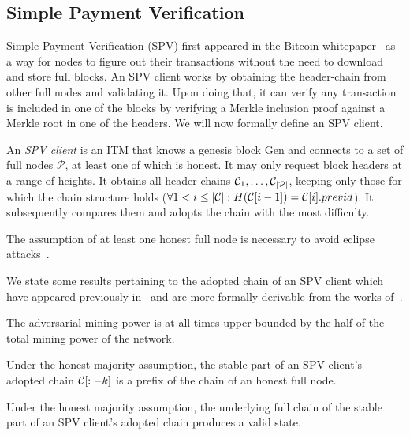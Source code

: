 \subsection{Simple Payment Verification}
Simple Payment Verification (SPV) first appeared in the Bitcoin whitepaper~\cite{bitcoin} as a way for nodes to figure out their transactions without the need to download and store full blocks. An SPV client works by obtaining the header-chain from other full nodes and validating it. Upon doing that, it can verify any transaction is included in one of the blocks by verifying a Merkle inclusion proof against a Merkle root in one of the headers. We will now formally define an SPV client.

\begin{definition}
An \emph{SPV client} is an ITM that knows a genesis block \textsf{Gen} and connects to a set of full nodes $\mathcal{P}$, at least one of which is honest. It may only request block headers at a range of heights. It obtains all header-chains $\mathcal{C}_1, \dots, \mathcal{C}_{|\mathcal{P}|}$, keeping only those for which the chain structure holds ($\forall 1 < i \le |\mathcal{C}|: H(\mathcal{C}[i-1]) = \mathcal{C}[i].previd$). It subsequently compares them and adopts the chain with the most difficulty.
\end{definition}

The assumption of at least one honest full node is necessary to avoid eclipse attacks~\cite{eclipse,eclipse-ethereum}.

We state some results pertaining to the adopted chain of an SPV client which have appeared previously in~\cite{sok,sidechains} and are more formally derivable from the works of~\cite{backbone,garay2017bitcoin,pass2017analysis}.

\begin{definition}
The adversarial mining power is at all times upper bounded by the half of the total mining power of the network.
\end{definition}

\begin{theorem}
Under the honest majority assumption, the stable part of an SPV client's adopted chain $\mathcal{C}[:-k]$ is a prefix of the chain of an honest full node.
\end{theorem}

\begin{corollary}
Under the honest majority assumption, the underlying full chain of the stable part of an SPV client's adopted chain produces a valid state.
\end{corollary}
